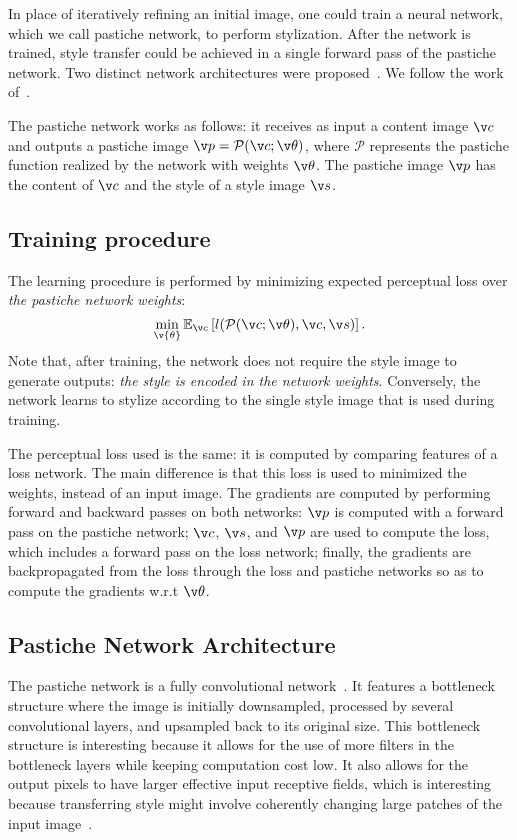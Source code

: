In place of iteratively refining an initial image, one could train a neural network, which we call pastiche network, to perform stylization. After the network is trained, style transfer could be achieved in a single forward pass of the pastiche network. Two distinct network architectures were proposed~\cite{ulyanov2016texture, johnson2016perceptual}. We follow the work of~\cite{johnson2016perceptual}.

The pastiche network works as follows: it receives as input a content image $\v c$ and outputs a pastiche image $\v p = \mathcal{P}(\v c; \v \theta)$, where $\mathcal{P}$ represents the pastiche function realized by the network with weights $\v \theta$. The pastiche image $\v p$ has the content of $\v c$ and the style of a style image $\v s$.

\subsection{Training procedure}
The learning procedure is performed by minimizing expected perceptual loss over \textit{the pastiche network weights}:
\begin{equation}
\min_{\v{\theta}}\mathbb{E}_{\v c}\left[l(\mathcal{P}(\v c; \v \theta), \v c, \v s)\right].
\end{equation}
Note that, after training, the network does not require the style image to generate outputs: \textit{the style is encoded in the network weights}. Conversely, the network learns to stylize according to the single style image that is used during training.

The perceptual loss used is the same: it is computed by comparing features of a loss network. The main difference is that this loss is used to minimized the weights, instead of an input image. The gradients are computed by performing forward and backward passes on both networks: $\v p$ is computed with a forward pass on the pastiche network; $\v c$, $\v s$, and $\v p$ are used to compute the loss, which includes a forward pass on the loss network; finally, the gradients are backpropagated from the loss through the loss and pastiche networks so as to compute the gradients w.r.t $\v \theta$.%

\subsection{Pastiche Network Architecture}
The pastiche network is a fully convolutional network~\cite{long2015fully}. It features a bottleneck structure where the image is initially downsampled, processed by several convolutional layers, and upsampled back to its original size. This bottleneck structure is interesting because it allows for the use of more filters in the bottleneck layers while keeping computation cost low. It also allows for the output pixels to have larger effective input receptive fields, which is interesting because transferring style might involve coherently changing large patches of the input image~\cite{johnson2016perceptual}.


